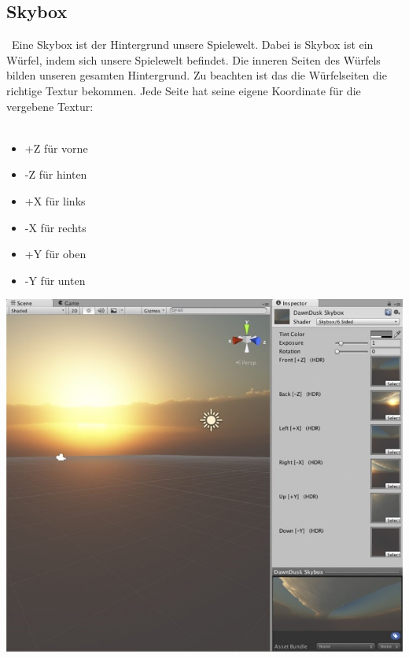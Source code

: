 \pagebreak
{}
\subsection{Skybox}\
Eine Skybox ist der Hintergrund unsere Spielewelt. Dabei is Skybox ist ein Würfel, indem sich unsere Spielewelt befindet. Die inneren Seiten des Würfels bilden unseren gesamten Hintergrund.
Zu beachten ist das die Würfelseiten die richtige Textur bekommen. Jede Seite hat seine eigene Koordinate für die vergebene Textur:\\\\

\begin{minipage}{0.4\textwidth}
    \begin{itemize}
        \item +Z für vorne 
        \item -Z für hinten 
        \item +X für links 
        \item -X für rechts
        \item +Y für oben
        \item -Y für unten
    \end{itemize}
  \end{minipage}
  \hfill
  \begin{minipage}{0.6\textwidth}
    \includegraphics[width=\linewidth]{chapters/14/Images/Skybox.png}
  \end{minipage}